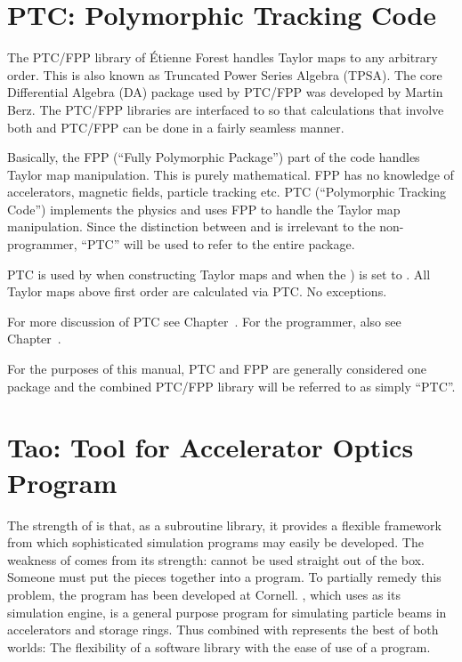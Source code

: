 \section{PTC: Polymorphic Tracking Code}
\label{s:ptc.intro}

The PTC/FPP library of \'Etienne Forest handles Taylor maps to any arbitrary order. This is also
known as Truncated Power Series Algebra (TPSA). The core Differential Algebra (DA) package used by
PTC/FPP was developed by Martin Berz\cite{b:berz}. The PTC/FPP libraries are interfaced to \bmad so
that calculations that involve both \bmad and PTC/FPP can be done in a fairly seamless manner.

Basically, the FPP (``Fully Polymorphic Package'') part of the code handles Taylor map
manipulation. This is purely mathematical. FPP has no knowledge of accelerators, magnetic fields,
particle tracking etc. PTC (``Polymorphic Tracking Code'') implements the physics and uses FPP to
handle the Taylor map manipulation. Since the distinction between  and  is
irrelevant to the non-programmer, ``PTC'' will be used to refer to the entire package.

PTC is used by \bmad when constructing Taylor maps and when the 
) is set to . All Taylor maps above first order are calculated
via PTC. No exceptions.

For more discussion of PTC see Chapter~.  For the programmer, also see
Chapter~.

For the purposes of this manual, PTC and FPP are generally considered one package and
the combined PTC/FPP library will be referred to as simply ``PTC''.

\section{Tao: Tool for Accelerator Optics Program}
\label{s:tao.intro}

The strength of \bmad is that, as a subroutine library, it provides a flexible framework from which
sophisticated simulation programs may easily be developed.  The weakness of \bmad comes from its
strength: \bmad cannot be used straight out of the box. Someone must put the pieces together into a
program. To partially remedy this problem, the \tao program\cite{b:tao} has been developed at
Cornell. \tao, which uses \bmad as its simulation engine, is a general purpose program for
simulating particle beams in accelerators and storage rings.  Thus \bmad combined with \tao
represents the best of both worlds: The flexibility of a software library with the ease of use of a
program.

